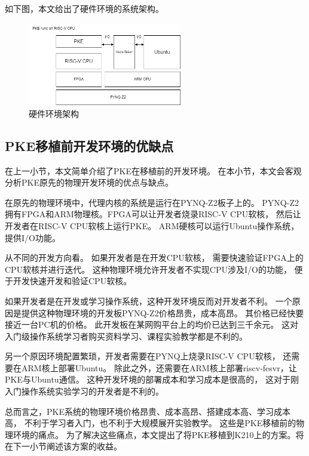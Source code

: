 如下图，本文给出了硬件环境的系统架构。

\begin{figure}[htbp]
    \vspace{13pt} %
    \centering
    \includegraphics[width=0.6\textwidth]{images/pke_hardware_env.drawio.png}
    \caption{硬件环境架构}\label{硬件环境架构} %
\end{figure}

\subsection{PKE移植前开发环境的优缺点}

在上一小节，本文简单介绍了PKE在移植前的开发环境。
在本小节，本文会客观分析PKE原先的物理开发环境的优点与缺点。

在原先的物理环境中，代理内核的系统是运行在PYNQ-Z2板子上的。
PYNQ-Z2拥有FPGA和ARM物理核。FPGA可以让开发者烧录RISC-V CPU软核，
然后让开发者在RISC-V CPU软核上运行PKE。
ARM硬核可以运行Ubuntu操作系统，提供I/O功能。

从不同的开发方向看。
如果开发者是在开发CPU软核，
需要快速验证FPGA上的CPU软核并进行迭代。
这种物理环境允许开发者不实现CPU涉及I/O的功能，
便于开发快速开发和验证CPU软核。

如果开发者是在开发或学习操作系统，这种开发环境反而对开发者不利。
一个原因是提供这种物理环境的开发板PYNQ-Z2价格昂贵，成本高昂。
其价格已经快要接近一台PC机的价格。
此开发板在某网购平台上的均价已达到三千余元。
这对入门级操作系统学习者购买资料学习、课程实验教学都是不利的。

另一个原因环境配置繁琐，开发者需要在PYNQ上烧录RISC-V CPU软核，
还需要在ARM核上部署Ubuntu。
除此之外，还需要在ARM核上部署riscv-fesvr，让PKE与Ubuntu通信。
这种开发环境的部署成本和学习成本是很高的，
这对于刚入门操作系统实验学习的开发者是不利的。

总而言之，PKE系统的物理环境价格昂贵、成本高昂、搭建成本高、学习成本高，
不利于学习者入门，也不利于大规模展开实验教学。
这些是PKE移植前的物理环境的痛点。
为了解决这些痛点，本文提出了将PKE移植到K210上的方案。将在下一小节阐述该方案的收益。

